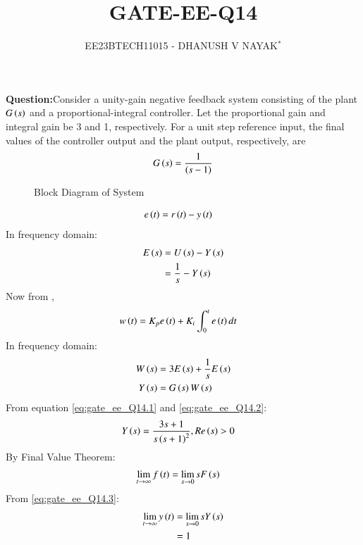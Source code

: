 \documentclass[journal,12pt,twocolumn]{IEEEtran}
\theoremstyle{remark}
\begin{document}

\title{GATE-EE-Q14}
\author{EE23BTECH11015 - DHANUSH V NAYAK$^{*}$%
}
\maketitle
\newpage
\bigskip
\renewcommand{\thefigure}{\arabic{figure}}
\renewcommand{\thetable}{\theenumi}
\textbf{Question:}Consider a unity-gain negative feedback system consisting of the plant $G\left(s\right)$  and a proportional-integral controller. Let the proportional gain and integral
gain be 3 and 1, respectively. For a unit step reference input, the final values of the
controller output and the plant output, respectively, are
\begin{align}
    G\left(s\right) = \frac{1}{\left(s-1\right)} \notag
\end{align}
\solution 

\begin{figure}[H]
    \resizebox{0.52\textwidth}{!}{}
    \caption{Block Diagram of System}
    \label{fig:gate_ee_Q14_blockdiagram}
\end{figure}
\begin{align}
    e\left(t\right) &= r\left(t\right) - y\left(t\right)  
\end{align}
In frequency domain:
\begin{align}
    E\left(s\right)&= U\left(s\right) - Y\left(s\right)\\
             &= \frac{1}{s} - Y\left(s\right)\label{eq:gate_ee_Q14.1}
\end{align} 
Now from ,
\begin{align}
    w\left(t\right) &= K_{p}e\left(t\right) + K_{i}\int_{0}^{t}e\left(t\right) dt
\end{align}
In frequency domain:
\begin{align}
    W\left(s\right) &= 3E\left(s\right) + \frac{1}{s}E\left(s\right)\label{eq:gate_ee_Q14.2}\\
    Y\left(s\right) &= G\left(s\right)W\left(s\right)
\end{align}
From equation \eqref{eq:gate_ee_Q14.1} and \eqref{eq:gate_ee_Q14.2}:
\begin{align}
    Y\left(s\right) &=  \frac{3s+1}{s\left(s+1\right)^2} ,  Re\left(s\right)>0
\end{align}
By Final Value Theorem:
\begin{align}
    \lim_{t \to \infty} f\left(t\right)&= \lim_{s \to 0} sF\left(s\right)\label{eq:gate_ee_Q14.3}
\end{align}
From \eqref{eq:gate_ee_Q14.3}:
\begin{align}
     \lim_{t \to \infty} y\left(t\right)&= \lim_{s \to 0} sY\left(s\right)\\
                            &= 1
\end{align}
\end{document}
